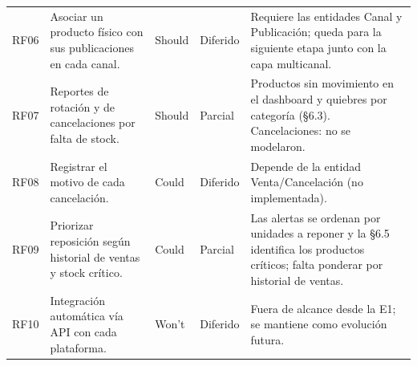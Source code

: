 \documentclass[11pt,letterpaper]{article}
\renewcommand{\_}{\oldus\allowbreak}
\newcommand{\parcial}{Parcial}
\newcommand{\diferido}{Diferido}
\begin{document}
\begin{small}
\begin{longtable}{>{\raggedright\arraybackslash}p{1.0cm} >{\raggedright\arraybackslash}p{3.7cm} >{\raggedright\arraybackslash}p{1.1cm} >{\raggedright\arraybackslash}p{2.0cm} >{\raggedright\arraybackslash}p{5.2cm}}
RF06 & Asociar un producto físico con sus publicaciones en cada canal. & Should & \diferido & Requiere las entidades Canal y Publicación; queda para la siguiente etapa junto con la capa multicanal. \\
RF07 & Reportes de rotación y de cancelaciones por falta de stock. & Should & \parcial & Productos sin movimiento en el dashboard y quiebres por categoría (§6.3). Cancelaciones: no se modelaron. \\
RF08 & Registrar el motivo de cada cancelación. & Could & \diferido & Depende de la entidad Venta/Cancelación (no implementada). \\
RF09 & Priorizar reposición según historial de ventas y stock crítico. & Could & \parcial & Las alertas se ordenan por unidades a reponer y la §6.5 identifica los productos críticos; falta ponderar por historial de ventas. \\
RF10 & Integración automática vía API con cada plataforma. & Won't & \diferido & Fuera de alcance desde la E1; se mantiene como evolución futura. \\
\end{longtable}
\end{small}
\end{document}
